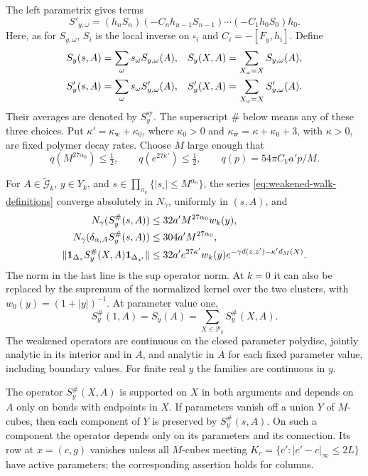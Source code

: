 The left parametrix gives terms
\[
 S'_{y,\omega}=(h_nS_n)(-C_nh_{n-1}S_{n-1})\cdots
                 (-C_1h_0S_0)h_0.
\]
Here, as for $S_{y,\omega}$, $S_i$ is the local inverse on
$\square_i$ and $C_i=-[F_y,h_i]$. Define
\begin{align}
 S_y(s,A)&=\sum_\omega s_\omega S_{y,\omega}(A),&
 S_y(X,A)&=\sum_{X_\omega=X}S_{y,\omega}(A),\label{eq:weakened-walk-definitions}\\
 S'_y(s,A)&=\sum_\omega s_\omega S'_{y,\omega}(A),&
 S'_y(X,A)&=\sum_{X_\omega=X}S'_{y,\omega}(A).\notag
\end{align}
Their averages are denoted by $S_y^{\mathrm{sy}}$. The superscript
$\#$ below means any of these three choices. Put
$\kappa'=\kappa_{\mathrm w}+\kappa_0$, where
$\kappa_0>0$ and $\kappa_{\mathrm w}=\kappa+\kappa_0+3$, with $\kappa>0$, are fixed polymer decay rates.
Choose $M$ large enough that
\begin{equation}\label{eq:weakened-walk-contraction}
 q(M^{27\alpha_0})\le\tfrac12,\qquad
 q(e^{27\kappa'})\le\tfrac12,
 \qquad q(p)=54\pi C_Va'p/M.
\end{equation}

\begin{proposition}\label{prop:weakened-polymer-propagators}
For $A\in\widetilde{\mathcal G}_k$, $y\in Y_k$, and
$s\in\prod_{\pi_k}\{|s_\square|\le M^{\alpha_0}\}$, the series
\eqref{eq:weakened-walk-definitions} converge absolutely in $N_\gamma$,
uniformly in $(s,A)$, and
\begin{align}
 N_\gamma(S_y^\#(s,A))&\le32a'M^{27\alpha_0}w_k(y),
                                       \label{eq:weakened-propagator-bound}\\
 N_\gamma(\delta_{\alpha,A}S_y^\#(s,A))&\le304a'M^{27\alpha_0},\notag\\
 \|\mathbf1_{\Delta_z}S_y^\#(X,A)\mathbf1_{\Delta_{z'}}\|
   &\le32a'e^{27\kappa'}w_k(y)
       e^{-\gamma d(z,z')-\kappa'd_M(X)}.
                                       \label{eq:polymer-propagator-bound}
\end{align}
The norm in the last line is the sup operator norm. At $k=0$ it can
also be replaced by the supremum of the normalized kernel over the two
clusters, with $w_0(y)=(1+|y|)^{-1}$.
At parameter value one,
\begin{equation}\label{eq:polymer-propagator-sum}
 S_y^\#(1,A)=S_y(A)=\sum_{X\in\mathcal P_k}S_y^\#(X,A).
\end{equation}
The weakened operators are continuous on the closed parameter
polydisc, jointly analytic in its interior and in $A$, and analytic in
$A$ for each fixed parameter value, including boundary values.
For finite real $y$ the families are continuous in $y$.

The operator $S_y^\#(X,A)$ is supported on $X$ in both arguments and
depends on $A$ only on bonds with endpoints in $X$. If parameters vanish
off a union $Y$ of $M$-cubes, then each component of $Y$ is preserved by
$S_y^\#(s,A)$. On such a component the operator depends only on its
parameters and its connection. Its row at $x=(c,g)$ vanishes unless all
$M$-cubes meeting $K_c=\{c':|c'-c|_\infty\le2L\}$ have active
parameters; the corresponding assertion holds for columns.
\end{proposition}

